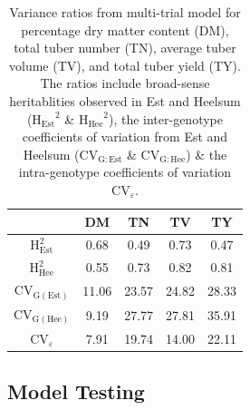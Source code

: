 \begin{refsection}
\begin{table}
    \caption{Variance ratios from multi-trial model for percentage dry matter content (DM), total tuber number (TN), average tuber volume (TV), and total tuber yield (TY). The ratios include broad-sense heritablities observed in Est and Heelsum (\(\mathrm{H_{Est}}^2\) \& \(\mathrm{H_{Hee}}^2\)), the inter-genotype coefficients of variation from Est and Heelsum (\(\mathrm{CV_{G:Est}}\) \& \(\mathrm{CV_{G:Hee}}\)) \&  the intra-genotype coefficients of variation \(\mathrm{CV}_{\varepsilon}\).}
\label{tbl:trait-variances}
\begin{tabular}{ccccc}
\toprule
 & DM & TN & TV & TY\\
\midrule
\(\mathrm{H_{Est}^2}\) & 0.68 & 0.49 & 0.73 & 0.47\\
\(\mathrm{H_{Hee}^2}\) & 0.55 & 0.73 & 0.82 & 0.81\\
\(\mathrm{CV_{G(Est)}}\) & 11.06 & 23.57 & 24.82 & 28.33\\
\(\mathrm{CV_{G(Hee)}}\) & 9.19 & 27.77 & 27.81 & 35.91\\
\(\mathrm{CV}_{\varepsilon}\) & 7.91 & 19.74 & 14.00 & 22.11\\
\bottomrule
\end{tabular}
\end{table}



\subsection{Model Testing}


\end{refsection}

